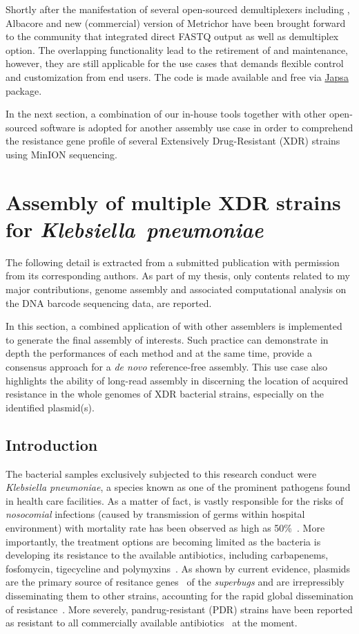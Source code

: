 Shortly after the manifestation of several open-sourced demultiplexers including \npbarcode{}, Albacore and new (commercial) version of Metrichor have been brought forward to the community that integrated direct FASTQ output as well as demultiplex option. The overlapping functionality lead to the retirement of \npreader{} and \npbarcode{} maintenance, however, they are still applicable for the use cases that demands flexible control and customization from end users. The code is made available and free via \href{https://github.com/mdcao/japsa}{Japsa} package.  

In the next section, a combination of our in-house tools together with other open-sourced software is adopted for another assembly use case in order to comprehend the resistance gene profile of several Extensively Drug-Resistant (XDR) \kp{} strains using MinION sequencing.

\section{Assembly of multiple XDR strains for \emph{Klebsiella~pneumoniae}} 
The following detail is extracted from a submitted publication with permission from its corresponding authors.
As part of my thesis, only contents related to my major contributions, \IE{} genome assembly and associated computational analysis on the DNA barcode sequencing data, are reported. 

In this section, a combined application of \npscarf{} with other assemblers is implemented to generate the final assembly of interests. Such practice can demonstrate in depth the performances of each method and at the same time, provide a consensus approach for a \emph{de novo} reference-free assembly.
This use case also highlights the ability of long-read assembly in discerning the location of acquired resistance in the whole genomes of XDR bacterial strains, especially on the identified plasmid(s).
\subsection{Introduction}
The bacterial samples exclusively subjected to this research conduct were \emph{Klebsiella pneumoniae}, a species known as one of the prominent pathogens found in health care facilities.
As a matter of fact, \kp{} is vastly responsible for the risks of \emph{nosocomial} infections (caused by transmission of germs within hospital environment) with mortality rate has been observed as high as 50\%~\cite{Martin2018M1,Magill2014M2,Kalanuria2014M3,Talha2009M4,Podschun1998M5}. 
More importantly, the treatment options are becoming limited as the bacteria is developing its resistance to the available antibiotics, including carbapenems, fosfomycin, tigecycline and polymyxins~\cite{Karaiskos2014M7}. As shown by current evidence, plasmids are the primary source of resitance genes~\cite{HudsonBMW2014} of the \emph{superbugs} and are irrepressibly disseminating them to other strains, accounting for the rapid global dissemination of resistance~\cite{Martin2018M1,Navon2017M6}. 
More severely, pandrug-resistant (PDR) \kp{} strains have been reported as resistant to all commercially available antibiotics~\cite{Chen2017M8,Zowawi2015} at the moment.

